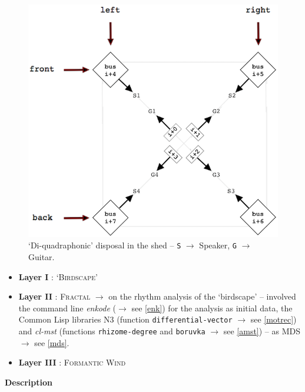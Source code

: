  \begin{figure}[H]
\begin{center}
\includegraphics[scale=3.5]{img/6644}
\caption{`Di-quadraphonic' disposal in the shed -- \texttt{S} $\rightarrow$ Speaker, \texttt{G} $\rightarrow$ Guitar.}
\label{dpan}
\end{center}
\end{figure}

\begin{itemize}[leftmargin=0.4in]
\item \textbf{Layer I} : \textsc{`Birdscape'} 
\item \textbf{Layer II} : \textsc{Fractal} $\rightarrow$ on the rhythm analysis of the `birdscape' -- involved the command line \textsl{enkode} ($\rightarrow$ see \ref{enk}) for the analysis as initial data, the Common Lisp libraries N3 (function \texttt{differential-vector} $\rightarrow$ see \ref{motrec}) and \textsl{cl-mst} (functions \texttt{rhizome-degree} and \texttt{boruvka} $\rightarrow$ see \ref{amst}) -- as MDS $\rightarrow$ see \ref{mds}. 
\item \textbf{Layer III} : \textsc{Formantic Wind} 
\end{itemize}

\bigskip

\noindent \textbf{{\large Description}}
\hrulefill

\bigskip


